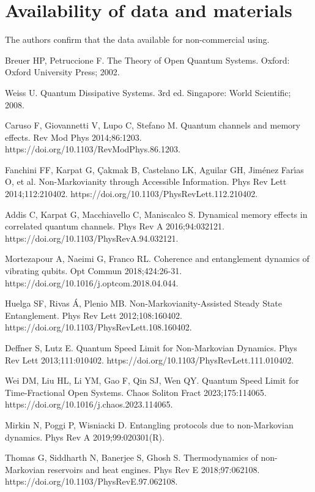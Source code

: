 \documentclass[
showpacs,  %
showkeys,  %
aps,       %
amsthm,    %
amsmath,   %
amsfonts,  %
amssymb    %
]{revtex4-1}          %
\begin{document}
\section*{Availability of data and materials }
The authors confirm that the data available for non-commercial using.

\begin{thebibliography}{}
Breuer HP, Petruccione F. The Theory of Open Quantum Systems. Oxford: Oxford University Press; 2002.

Weiss U. Quantum Dissipative Systems. 3rd ed. Singapore: World Scientific; 2008.

Caruso F, Giovannetti V, Lupo C, Stefano M. Quantum channels and memory effects. Rev Mod Phys 2014;86:1203. https://doi.org/10.1103/RevModPhys.86.1203.

Fanchini FF, Karpat G, \c{C}akmak B, Castelano LK, Aguilar GH, Jim\'{e}nez Far\'{\i}as O, et al. Non-Markovianity through Accessible Information. Phys Rev Lett 2014;112:210402. https://doi.org/10.1103/PhysRevLett.112.210402.

Addis C, Karpat G, Macchiavello C, Maniscalco S. Dynamical memory effects in correlated quantum channels. Phys Rev A 2016;94:032121. https://doi.org/10.1103/PhysRevA.94.032121.

Mortezapour A, Naeimi G, Franco RL. Coherence and entanglement dynamics of vibrating qubits. Opt Commun 2018;424:26-31. https://doi.org/10.1016/j.optcom.2018.04.044.

Huelga SF, Rivas \'{A}, Plenio MB. Non-Markovianity-Assisted Steady State Entanglement. Phys Rev Lett 2012;108:160402. https://doi.org/10.1103/PhysRevLett.108.160402.

Deffner S, Lutz E. Quantum Speed Limit for Non-Markovian Dynamics. Phys Rev Lett 2013;111:010402. https://doi.org/10.1103/PhysRevLett.111.010402.

Wei DM, Liu HL, Li YM, Gao F, Qin SJ, Wen QY. Quantum Speed Limit for Time-Fractional Open Systems. Chaos Soliton Fract 2023;175:114065. https://doi.org/10.1016/j.chaos.2023.114065.

Mirkin N, Poggi P, Wisniacki D. Entangling protocols due to non-Markovian dynamics. Phys Rev A 2019;99:020301(R).

Thomas G, Siddharth N, Banerjee S, Ghosh S. Thermodynamics of non-Markovian reservoirs and heat engines. Phys Rev E 2018;97:062108. https://doi.org/10.1103/PhysRevE.97.062108.


\end{thebibliography}
\end{document}
